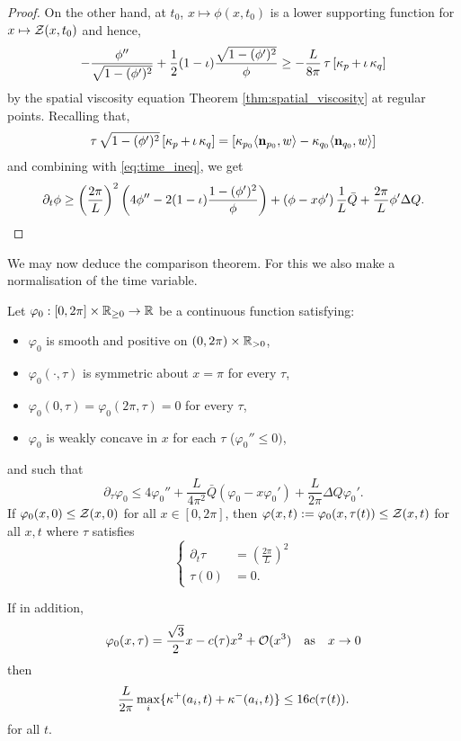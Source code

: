 \documentclass[11pt]{amsart}
\begin{document}
\begin{proof}
On the other hand, at $t_0$, $x \mapsto \phi(x, t_0)$ is a lower supporting function for $x \mapsto \operatorname{\mathcal{Z}}(x, t_0)$ and hence,
\begin{equation}
\label{eq:spatial_inequality}
-\frac{\phi''}{\sqrt{1-(\phi')^2}} + \frac{1}{2} (1-\operatorname{\iota}) \frac{\sqrt{1 - (\phi')^2}}{\phi} \geq -\frac{L}{8\pi} \operatorname{\tau} \left[\operatorname{\kappa}_p + \operatorname{\iota} \operatorname{\kappa}_q\right]
\end{equation}
by the spatial viscosity equation Theorem \ref{thm:spatial_viscosity} at regular points. Recalling that,
\[
\operatorname{\tau} \sqrt{1 - (\phi')^2} \left[\operatorname{\kappa}_p + \operatorname{\iota} \operatorname{\kappa}_q\right] = \left[\operatorname{\kappa}_{p_0} \langle{\operatorname{\mathbf{n}}_{p_0}},{w}\rangle - \operatorname{\kappa}_{q_0} \langle{\operatorname{\mathbf{n}}_{q_0}},{w}\rangle\right]
\]
and combining with \eqref{eq:time_ineq}, we get
\[
\partial_t \phi \geq \left(\frac{2\pi}{L}\right)^2 \left(4 \phi'' - 2 (1-\operatorname{\iota}) \frac{1 - (\phi')^2}{\phi}\right) + \left(\phi - x \phi'\right) \frac{1}{L} \bar{Q} + \frac{2\pi}{L} \phi' \Delta Q.
\]
\end{proof}

We may now deduce the comparison theorem. For this we also make a normalisation of the time variable.

\begin{theorem}
\label{thm:comparison}

Let $\varphi_0 : [0, 2\pi] \times \mathbb{R}_{\geq 0} \to \mathbb{R}$ be a continuous function satisfying:
\begin{itemize}
\item $\varphi_0$ is smooth and positive on $(0, 2\pi) \times \mathbb{R}_{>0}$,
\item $\varphi_0(\cdot, \tau)$ is symmetric about $x = \pi$ for every $\tau$,
\item $\varphi_0(0, \tau) = \varphi_0(2\pi, \tau) = 0$ for every $\tau$,
\item $\varphi_0$ is weakly concave in $x$ for each $\tau$ ($\varphi_0'' \leq 0)$,
\end{itemize}
and such that
\begin{equation}
\label{eq:comparison_ineq}
\partial_{\tau} \varphi_0 \leq 4 \varphi_0'' + \frac{L}{4\pi^2} \bar{Q} (\varphi_0 - x \varphi_0') + \frac{L}{2\pi} \Delta Q \varphi_0'.
\end{equation}
If $\varphi_0(x, 0) \leq \operatorname{\mathcal{Z}}(x, 0)$ for all $x \in [0, 2\pi]$, then $\varphi(x, t) := \varphi_0(x, \tau(t)) \leq \operatorname{\mathcal{Z}}(x, t)$ for all $x, t$ where $\tau$ satisfies
\[
\begin{cases}
\partial_t \tau &= \left(\frac{2\pi}{L}\right)^2 \\
\tau(0) &= 0.
\end{cases}
\]

If in addition,
\[
\varphi_0(x, \tau) = \frac{\sqrt{3}}{2} x - c(\tau) x^2 + \operatorname{\mathcal{O}}(x^3) \quad \text{as} \quad x \to 0
\]
then
\[
\frac{L}{2\pi} \max_i \{\operatorname{\kappa}^+(a_i, t) + \operatorname{\kappa}^-(a_i, t)\} \leq 16 c(\tau(t)).
\]
for all $t$.
\end{theorem}
\end{document}
